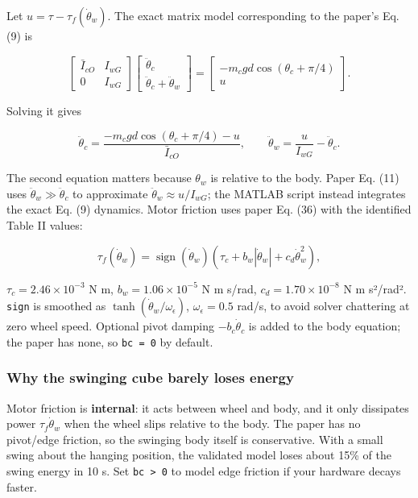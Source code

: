 \documentclass[
]{article}
\newcounter{none} %
\begin{document}
Let \(u=\tau-\tau_f(\dot\theta_w)\). The exact matrix model
corresponding to the paper's Eq. (9) is

\[\begin{bmatrix}
\bar I_{cO} & I_{wG}\\
0 & I_{wG}
\end{bmatrix}
\begin{bmatrix}
\ddot\theta_c\\
\ddot\theta_c+\ddot\theta_w
\end{bmatrix}
=
\begin{bmatrix}
-m_cgd\cos(\theta_c+\pi/4)\\
u
\end{bmatrix}.\]

Solving it gives

\[\ddot\theta_c=
\frac{-m_cgd\cos(\theta_c+\pi/4)-u}{\bar I_{cO}},
\qquad
\ddot\theta_w=\frac{u}{I_{wG}}-\ddot\theta_c.\]

The second equation matters because \(\theta_w\) is relative to the
body. Paper Eq. (11) uses \(\ddot\theta_w\gg\ddot\theta_c\) to
approximate \(\ddot\theta_w\approx u/I_{wG}\); the MATLAB script instead
integrates the exact Eq. (9) dynamics. Motor friction uses paper Eq.
(36) with the identified Table II values:

\[\tau_f(\dot\theta_w)=\operatorname{sign}(\dot\theta_w)
\left(\tau_c+b_w|\dot\theta_w|+c_d\dot\theta_w^2\right),\]

\(\tau_c=2.46\times10^{-3}\) N m, \(b_w=1.06\times10^{-5}\) N m s/rad,
\(c_d=1.70\times10^{-8}\) N m s²/rad². \texttt{sign} is smoothed as
\(\tanh(\dot\theta_w/\omega_\epsilon)\), \(\omega_\epsilon=0.5\) rad/s,
to avoid solver chattering at zero wheel speed. Optional pivot damping
\(-b_c\dot\theta_c\) is added to the body equation; the paper has none,
so \texttt{bc\ =\ 0} by default.

\subsubsection{Why the swinging cube barely loses
energy}\label{why-the-swinging-cube-barely-loses-energy}

Motor friction is \textbf{internal}: it acts between wheel and body, and
it only dissipates power \(\tau_f\dot\theta_w\) when the wheel slips
relative to the body. The paper has no pivot/edge friction, so the
swinging body itself is conservative. With a small swing about the
hanging position, the validated model loses about 15\% of the swing
energy in 10 s. Set \texttt{bc\ \textgreater{}\ 0} to model edge
friction if your hardware decays faster.
\end{document}

